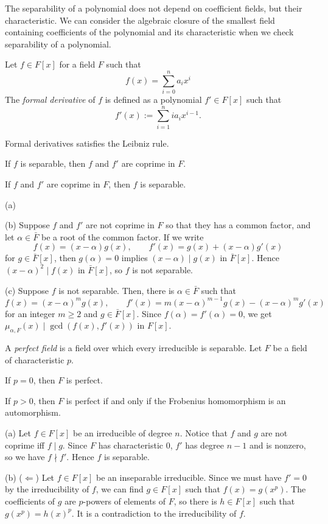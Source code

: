 \documentclass{../../large}
\begin{document}
The separability of a polynomial does not depend on coefficient fields, but their characteristic.
We can consider the algebraic closure of the smallest field containing coefficients of the polynomial and its characteristic when we check separability of a polynomial.

\begin{prb}
Let $f\in F[x]$ for a field $F$ such that
\[f(x)=\sum_{i=0}^na_ix^i\]
The \emph{formal derivative} of $f$ is defined as a polynomial $f'\in F[x]$ such that
\[f'(x):=\sum_{i=1}^nia_ix^{i-1}.\]
\begin{parts}
\item Formal derivatives satisfies the Leibniz rule.
\item If $f$ is separable, then $f$ and $f'$ are coprime in $F$.
\item If $f$ and $f'$ are coprime in $F$, then $f$ is separable.
\end{parts}
\end{prb}
\begin{pf}
(a)

(b)
Suppose $f$ and $f'$ are not coprime in $F$ so that they has a common factor, and let $\alpha\in\bar F$ be a root of the common factor.
If we write
\[f(x)=(x-\alpha)g(x),\qquad f'(x)=g(x)+(x-\alpha)g'(x)\]
for $g\in\bar F[x]$, then $g(\alpha)=0$ implies $(x-\alpha)\mid g(x)$ in $\bar F[x]$.
Hence $(x-\alpha)^2\mid f(x)$ in $\bar F[x]$, so $f$ is not separable.

(c)
Suppose $f$ is not separable.
Then, there is $\alpha\in\bar F$ such that
\[f(x)=(x-\alpha)^mg(x),\qquad f'(x)=m(x-\alpha)^{m-1}g(x)-(x-\alpha)^mg'(x)\]
for an integer $m\ge2$ and $g\in\bar F[x]$.
Since $f(\alpha)=f'(\alpha)=0$, we get $\mu_{\alpha,F}(x)\mid\gcd(f(x),f'(x))$ in $F[x]$.
\end{pf}


\begin{prb}
A \emph{perfect field} is a field over which every irreducible is separable.
Let $F$ be a field of characteristic $p$.
\begin{parts}
\item If $p=0$, then $F$ is perfect.
\item If $p>0$, then $F$ is perfect if and only if the Frobenius homomorphism is an automorphism.
\end{parts}
\end{prb}
\begin{pf}
(a)
Let $f\in F[x]$ be an irreducible of degree $n$.
Notice that $f$ and $g$ are not coprime iff $f\mid g$.
Since $F$ has characteristic 0, $f'$ has degree $n-1$ and is nonzero, so we have $f\nmid f'$.
Hence $f$ is separable.

(b)
($\Leftarrow$)
Let $f\in F[x]$ be an inseparable irreducible.
Since we must have $f'=0$ by the irreducibility of $f$, we can find $g\in F[x]$ such that $f(x)=g(x^p)$.
The coefficients of $g$ are $p$-powers of elements of $F$, so there is $h\in F[x]$ such that $g(x^p)=h(x)^p$.
It is a contradiction to the irreducibility of $f$.
\end{pf}
\end{document}
